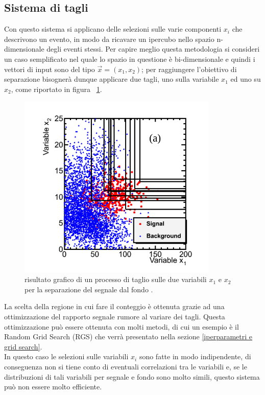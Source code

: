 \newpage


\subsection{Sistema di tagli}
\label{sistema di tagli}
Con questo sistema si applicano delle selezioni sulle varie componenti $x_i$ che descrivono un evento, in modo da ricavare un ipercubo nello spazio n-dimensionale degli eventi stessi. Per capire meglio questa metodologia si consideri un caso semplificato nel quale lo spazio in questione è bi-dimensionale e quindi i vettori di input sono del tipo $\vec{x} = (x_1,x_2)$; per raggiungere l'obiettivo di separazione bisognerà dunque applicare due tagli, uno sulla variabile $x_1$ ed uno su $x_2$, come riportato in figura ~\ref{fig:grid_example}.

\begin{figure}[h!]
	\centering
	\includegraphics[width=0.85\textwidth]{figs/Grid_example.png}
	\caption{risultato grafico di un processo di taglio sulle due variabili $x_1$ e $x_2$ per la separazione del segnale dal fondo \cite{Metodi_multivariati}.}
	\label{fig:grid_example}
\end{figure}

La scelta della regione in cui fare il conteggio è ottenuta grazie ad una ottimizzazione del rapporto segnale rumore al variare dei tagli. Questa ottimizzazione può essere ottenuta con molti metodi, di cui un esempio è il Random Grid Search (RGS) che verrà presentato nella sezione \ref{iperparametri e grid search}. \\
In questo caso le selezioni sulle variabili $x_i$ sono fatte in modo indipendente, di conseguenza non si tiene conto di eventuali correlazioni tra le variabili e, se le distribuzioni di tali variabili per segnale e fondo sono molto simili, questo sistema può non essere molto efficiente.

